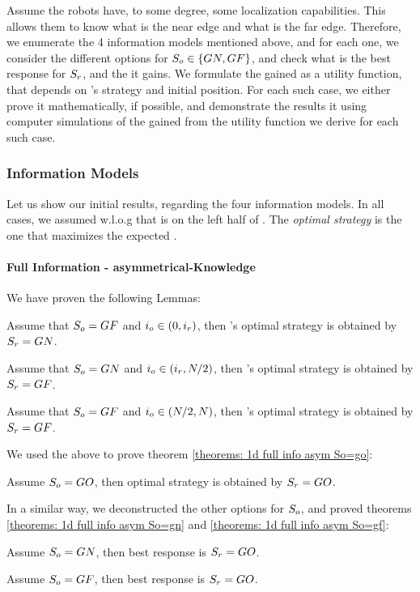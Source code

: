 \documentclass[a4paper,english,10pt]{article}
\begin{document}
Assume the robots have, to some degree, some localization capabilities. This allows them to know what is the near edge and what is the far edge.
Therefore, we enumerate the 4 information models mentioned above, and for each one, we consider the different options for $S_o\in \lbrace GN,GF\rbrace$, and check what is the best response for $S_r$, and the \fcc it gains. We formulate the gained \fcc as a utility function, that depends on \opp's strategy and initial position.
For each such case, we either prove it mathematically, if possible, and demonstrate the results it using computer simulations of the gained \fcc from the utility function we derive for each such case.


\subsubsection{Information Models}
Let us show our initial results, regarding the four information models. In all cases, we assumed w.l.o.g that \rob is on the left half of \w. The {\em optimal strategy} is the one that maximizes the expected \fcc.
\paragraph{Full Information - asymmetrical-Knowledge}
We have proven the following Lemmas:
\begin{lemma}
Assume that $ S_o=GF$ and $i_o \in (0,i_r)$, then {\rob}'s optimal strategy is obtained by $S_r=GN$.
\end{lemma}
\begin{lemma}
Assume that $ S_o=GN$ and $i_o \in (i_r, N/2)$, then {\rob}'s optimal strategy is obtained by $S_r=GF$.
\end{lemma}
\begin{lemma}
Assume that $ S_o=GF$ and $i_o \in (N/2,N)$, then {\rob}'s optimal strategy is obtained by $S_r=GF$.
\end{lemma}
We used the above to prove theorem \ref{theorems: 1d full info asym So=go}:
\begin{theorem} \label{theorems: 1d full info asym So=go}
Assume $S_o=GO$, then \rob optimal strategy is obtained by $S_r=GO$. 
\end{theorem}

In a similar way, we deconstructed the other options for $S_o$, and proved theorems \ref{theorems: 1d full info asym So=gn} and \ref{theorems: 1d full info asym So=gf}:
\begin{theorem} \label{theorems: 1d full info asym So=gn}
Assume $S_o=GN$, then \rob best response is $S_r=GO$.
\end{theorem}
\begin{theorem} \label{theorems: 1d full info asym So=gf}
Assume $S_o=GF$, then \rob best response is $S_r=GO$.
\end{theorem}
\end{document}
